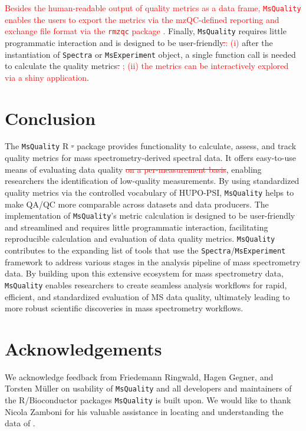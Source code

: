 \documentclass[unnumsec,webpdf,contemporary,large]{oup-authoring-template}%
\theoremstyle{thmstyleone}%
\theoremstyle{thmstyletwo}%
\theoremstyle{thmstylethree}%
\begin{document}
\textcolor{red}{Besides the human-readable output of quality metrics as a data frame, 
\texttt{MsQuality} enables the users to export the metrics via the mzQC-defined reporting 
and exchange file format via the \texttt{rmzqc} package \citep{Bielow2023}.}
Finally, \texttt{MsQuality} requires little programmatic interaction and is designed to be
user-friendly\textcolor{red}{\sout{.}}\textcolor{red}{: (i)}  after the instantiation of 
\texttt{Spectra} or \texttt{MsExperiment}
object, a single function call is needed to calculate the quality metrics\textcolor{red}{\sout{.}} 
\textcolor{red}{; (ii) the metrics can be interactively explored via a shiny application}.


\section{Conclusion}

The \texttt{MsQuality} R \textcolor{red}{\sout{-} }package provides functionality to calculate, assess, 
and track quality metrics for mass spectrometry-derived spectral data. 
It offers easy-to-use means of evaluating data quality \textcolor{red}{\sout{on a per-measurement 
basis}}, enabling researchers the identification of low-quality measurements.
By using standardized quality metrics via the controlled vocabulary of HUPO-PSI,
\texttt{MsQuality} helps to make QA/QC more comparable across datasets and 
data producers.
The implementation of \texttt{MsQuality}'s metric calculation is designed
to be user-friendly and streamlined and requires little programmatic 
interaction, facilitating reproducible calculation and evaluation of data 
quality metrics.
\texttt{MsQuality} contributes to the expanding list of 
tools that use the \texttt{Spectra}/\texttt{MsExperiment} framework 
\citep{Rainer2022} to address various stages in the analysis pipeline of 
mass spectrometry data. By building upon this extensive ecosystem for 
mass spectrometry data, 
\texttt{MsQuality} enables researchers to create seamless analysis workflows 
for rapid, efficient, and standardized evaluation of MS data quality, 
ultimately leading to more robust scientific discoveries in mass spectrometry
workflows.


\section{Acknowledgements}

We acknowledge feedback from Friedemann Ringwald, Hagen Gegner, and 
Torsten M\"uller on usability of 
\texttt{MsQuality} and all developers and maintainers of the R/Bioconductor 
packages \texttt{MsQuality} is built upon. We would like to thank Nicola Zamboni
for his valuable assistance in locating and understanding the data of 
\citet{Cherkaoui2022}. 
\end{document}
